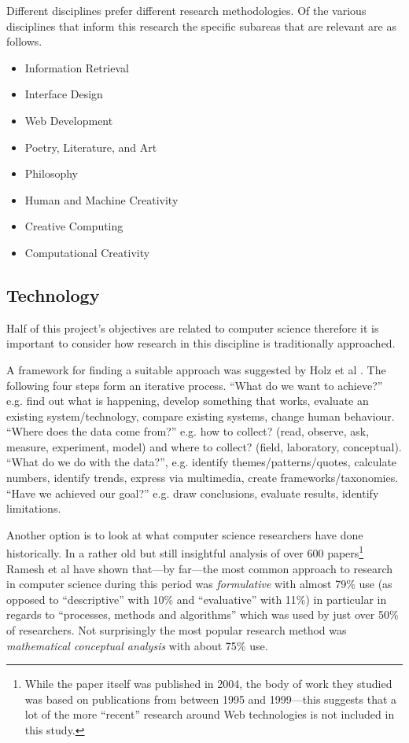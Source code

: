\documentclass[11pt]{thesis} %
\begin{document}
Different disciplines prefer different research methodologies. Of the various disciplines that inform this research the specific subareas that are relevant are as follows.

\begin{itemize}
  \item Information Retrieval
  \item Interface Design
  \item Web Development
  \item Poetry, Literature, and Art
  \item Philosophy
  \item Human and Machine Creativity
  \item Creative Computing
  \item Computational Creativity
\end{itemize}


\subsection{Technology}

Half of this project's objectives are related to computer science therefore it is important to consider how research in this discipline is traditionally approached.

A framework for finding a suitable approach was suggested by Holz et al \citeyear{Holz2006}. The following four steps form an iterative process. ``What do we want to achieve?'' e.g. find out what is happening, develop something that works, evaluate an existing system/technology, compare existing systems, change human behaviour. ``Where does the data come from?'' e.g. how to collect? (read, observe, ask, measure, experiment, model) and where to collect? (field, laboratory, conceptual). ``What do we do with the data?'', e.g. identify themes/patterns/quotes, calculate numbers, identify trends, express via multimedia, create frameworks/taxonomies. ``Have we achieved our goal?'' e.g. draw conclusions, evaluate results, identify limitations.

Another option is to look at what computer science researchers have done historically. In a rather old but still insightful analysis of over \num{600} papers\footnote{While the paper itself was published in 2004, the body of work they studied was based on publications from between 1995 and 1999---this suggests that a lot of the more ``recent'' research around Web technologies is not included in this study.} Ramesh et al \citeyear{Ramesh2004} have shown that---by far---the most common approach to research in computer science during this period was \emph{formulative} with almost 79\% use (as opposed to ``descriptive'' with 10\% and ``evaluative'' with 11\%) in particular in regards to ``processes, methods and algorithms'' which was used by just over 50\% of researchers. Not surprisingly the most popular research method was \emph{mathematical conceptual analysis} with about 75\% use.
\end{document}
